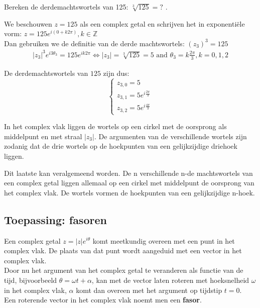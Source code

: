 \begin{voorbeeld}
	Bereken de derdemachtswortels van 125: $\sqrt[3]{125}=?$ .\\
	
	\vspace{0.5cm}
	
	We beschouwen $z=125$ als een complex getal en schrijven het in exponenti\"{e}le vorm: $z=125e^{i(0+k2\pi)}, k\in\mathbb{Z}$\\ Dan gebruiken we de definitie van de derde machtswortels: $(z_{3})^3 =125$ \\
	
	\[ \begin{array}{l} 
	|z_{3}|^3 e^{i3\theta_{3}} = 125e^{ik2\pi} 
	\iff |z_{3}|=\sqrt[3]{125}=5 \text{ and } \theta_{3}=k\frac{2\pi}{3}, k=0,1,2 
	\end{array} 
	\]
	
	De derdemachtswortels van $125$ zijn dus:\\
	
	\[  \left\{  \begin{array}{l}
	z_{3,0}=5 \\ z_{3,1}=5e^{i\frac{2\pi}{3}} \\ z_{3,2}=5e^{i\frac{4\pi}{3}} \end{array} \right.	
	\]
	
	
	In het complex vlak liggen de wortels op een cirkel met de oorsprong als middelpunt en met straal $|z_{3}|$. De argumenten van de verschillende wortels zijn zodanig dat de drie wortels op de hoekpunten van een gelijkzijdige driehoek liggen.\\
	
\end{voorbeeld}

Dit laatste kan veralgemeend worden. De n verschillende n-de machtswortels van een complex getal liggen allemaal op een cirkel met middelpunt de oorsprong van het complex vlak. De wortels vormen de hoekpunten van een gelijkzijdige n-hoek.\\


\subsection{Toepassing: fasoren}

Een complex getal $z=|z|e^{i\theta}$ komt meetkundig overeen met een punt in het complex vlak. De plaats van dat punt wordt aangeduid met een vector in het complex vlak.\\
Door nu het argument van het complex getal te veranderen als functie van de tijd, bijvoorbeeld $\theta= \omega t + \alpha$, kan met de vector laten roteren met hoeksnelheid $\omega$ in het complex vlak, $\alpha$ komt dan overeen met het argument op tijdstip $t=0$.\\
Een roterende vector in het complex vlak noemt men een {\bf fasor}.\\

